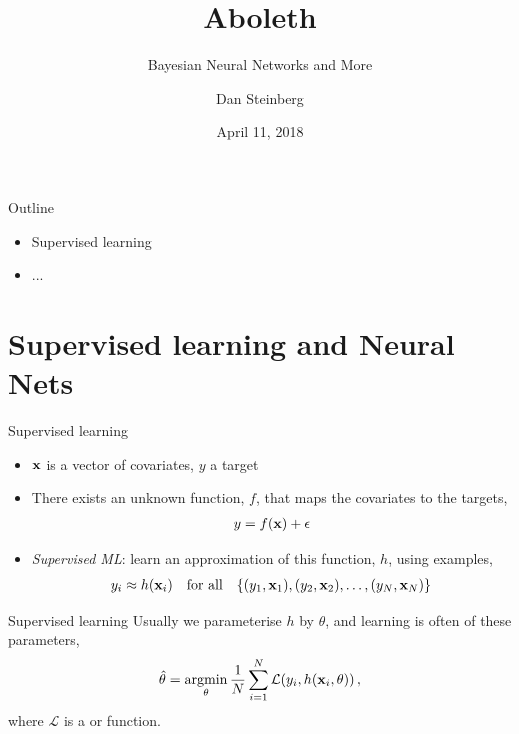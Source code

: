 \documentclass[lualatex, aspectratio=169]{beamer}
\title{Aboleth}
\subtitle{Bayesian Neural Networks and More}
\author{Dan Steinberg}
\date{April 11, 2018}
\institute{Inference Systems Engineering}
\begin{document}
\maketitle

\begin{frame}{Outline}
  \begin{itemize}
    \item Supervised learning
    \item ...
  \end{itemize}
\end{frame}

\section{Supervised learning and Neural Nets}


\begin{frame}{Supervised learning}
  \begin{itemize}
    \item <1-> $\mathbf{x}$ is a vector of covariates, $y$ a target 
    \item <2-> There exists an unknown function, $f$, that maps the covariates to the targets,
      \begin{align*}
        y = f(\mathbf{x}) + \epsilon
      \end{align*}
    \item <3-> \emph{Supervised ML}: learn an approximation of this function, $h$, using examples,
      \begin{align*}
        y_i \approx h(\mathbf{x}_i) \quad \text{for all} \quad \{(y_1, \mathbf{x}_1), (y_2, \mathbf{x}_2), \ldots,
          (y_N, \mathbf{x}_N) \}
      \end{align*}
  \end{itemize}
\end{frame}


\begin{frame}{Supervised learning}
  Usually we parameterise $h$ by $\theta$, and learning is often  of these parameters,
  \begin{align*}
    \hat{\theta} = \argmin_\theta \frac{1}{N} \sum^N_{i=1} \mathcal{L}\!\left(y_i, h(\v{x}_i, \theta)\right),
  \end{align*}
  where $\mathcal{L}$ is a  or  function.

\end{frame}
\end{document}
